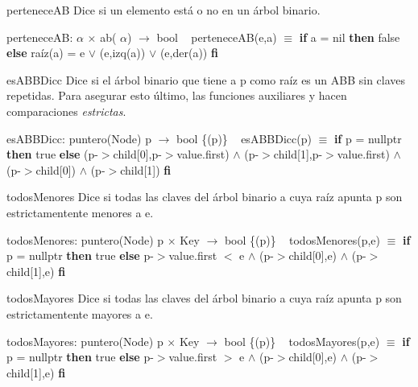\begin{DoxyParagraph}{pertenece\+AB}
Dice si un elemento está o no en un árbol binario.

pertenece\+AB\+:  $\alpha$ $\times$ ab( $\alpha$) $\to$ bool ~\newline
pertenece\+A\+B(e,a) $\equiv$ {\bfseries if} a = nil {\bfseries then} false {\bfseries else} raíz(a) = e $\lor$ (e,izq(a)) $\lor$ (e,der(a)) {\bfseries fi} 


\end{DoxyParagraph}
\begin{DoxyParagraph}{es\+A\+B\+B\+Dicc}
Dice si el árbol binario que tiene a p como raíz es un A\+BB sin claves repetidas. Para asegurar esto último, las funciones auxiliares  y  hacen comparaciones {\itshape estrictas}.

es\+A\+B\+B\+Dicc\+: puntero(\+Node) p $\to$ bool \{(p)\} ~\newline
es\+A\+B\+B\+Dicc(p) $\equiv$ {\bfseries if} p = nullptr {\bfseries then} true {\bfseries else} (p-\/$>$child\mbox{[}0\mbox{]},p-\/$>$value.\+first) $\land$ (p-\/$>$child\mbox{[}1\mbox{]},p-\/$>$value.\+first) $\land$ (p-\/$>$child\mbox{[}0\mbox{]}) $\land$ (p-\/$>$child\mbox{[}1\mbox{]}) {\bfseries fi} 


\end{DoxyParagraph}
\begin{DoxyParagraph}{todos\+Menores}
Dice si todas las claves del árbol binario a cuya raíz apunta p son estrictamentente menores a e.

todos\+Menores\+: puntero(\+Node) p $\times$ Key $\to$ bool \{(p)\} ~\newline
todos\+Menores(p,e) $\equiv$ {\bfseries if} p = nullptr {\bfseries then} true {\bfseries else} p-\/$>$value.\+first $<$ e $\land$ (p-\/$>$child\mbox{[}0\mbox{]},e) $\land$ (p-\/$>$child\mbox{[}1\mbox{]},e) {\bfseries fi} 


\end{DoxyParagraph}
\begin{DoxyParagraph}{todos\+Mayores}
Dice si todas las claves del árbol binario a cuya raíz apunta p son estrictamentente mayores a e.

todos\+Mayores\+: puntero(\+Node) p $\times$ Key $\to$ bool \{(p)\} ~\newline
todos\+Mayores(p,e) $\equiv$ {\bfseries if} p = nullptr {\bfseries then} true {\bfseries else} p-\/$>$value.\+first $>$ e $\land$ (p-\/$>$child\mbox{[}0\mbox{]},e) $\land$ (p-\/$>$child\mbox{[}1\mbox{]},e) {\bfseries fi} 


\end{DoxyParagraph}
